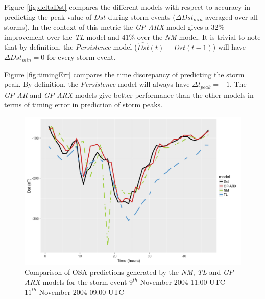 \documentclass[referee,a4paper,12pt,traditabstract]{swsc}
\begin{document}
\begin{linenumbers}
Figure \ref{fig:deltaDst} compares the different models with respect to accuracy in predicting the peak value of $Dst$ during storm events ($\Delta Dst_{min}$ averaged over all storms). In the context of this metric the \emph{GP-ARX} model gives a $32\%$ improvement over the \emph{TL} model and $41\%$ over the \emph{NM} model. It is trivial to note that by definition, the \emph{Persistence} model ($\hat{Dst}(t) = Dst(t-1)$) will have $\Delta Dst_{min} = 0$ for every storm event.

Figure \ref{fig:timingErr} compares the time discrepancy of predicting the storm peak. By definition, the \emph{Persistence} model will always have $\Delta t_{peak} = -1$. The \emph{GP-AR} and \emph{GP-ARX} models give better performance than the other models in terms of timing error in prediction of storm peaks. 

\begin{figure}
   \centering
   \includegraphics[width=\textwidth]{Compare_pred.png}
      \caption{Comparison of OSA predictions generated by the \emph{NM}, \emph{TL} and \emph{GP-ARX} models for the storm event $9^{th}$ November $2004$ 11:00 UTC - $11^{th}$ November $2004$ 09:00 UTC}
         \label{fig:predictions}
\end{figure}


\end{linenumbers}
\end{document}
